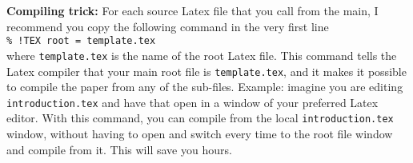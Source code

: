 \begin{remark}
\textbf{Compiling trick:} For each source Latex file that you call from the main, I recommend you copy the following command in the very first line\\
\texttt{\% !TEX root = template.tex}\\
where \texttt{template.tex} is the name of the root Latex file. This command tells the Latex compiler that your main root file is \texttt{template.tex}, and it makes it possible to compile the paper from any of the sub-files. Example: imagine you are editing \texttt{introduction.tex} and have that open in a window of your preferred Latex editor. With this command, you can compile from the local \texttt{introduction.tex} window, without having to open and switch every time to the root file window and compile from it. This will save you hours.  
\end{remark}

\\

